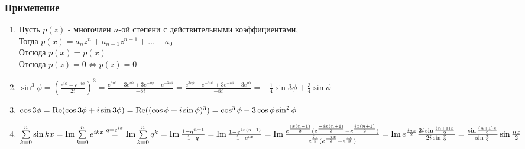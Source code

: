 \documentclass[12pt]{article}
\begin{document}
\subsubsection{Применение}
\begin{enumerate}
    \item Пусть $p(z)$ - многочлен $n$-ой степени с действительными коэффициентами,\\
    Тогда $p(x) = a_nz^n+a_{n-1}z^{n-1} + \ldots + a_0$\\
    Отсюда $p(\overline{x}) = \overline{p(x)}$\\
    Отсюда $p(z) = 0 \Leftrightarrow p(\overline{z}) = 0$
    \item $\sin^3 \phi = \left(\frac{e^{i\phi}-e^{-i\phi}}{2i}\right)^3 = \frac{e^{3i\phi}-3e^{i\phi}+3e^{-i\phi}-e^{-3i\phi}}{-8i} = \frac{e^{3i\phi}-e^{-3i\phi}+3e^{-i\phi}-3e^{i\phi}}{-8i} = -\frac14 \sin 3\phi + \frac34 \sin \phi$
    \item $\cos 3\phi = \operatorname{Re}(\cos 3\phi + i\sin 3\phi) = \operatorname{Re}((\cos \phi + i\sin\phi)^3) =\cos^3 \phi - 3\cos\phi\sin^2\phi$
    \item $\sum\limits_{k=0}^n \sin kx = \operatorname{Im} \sum\limits_{k=0}^n e^{ikx} \overset{q=e^{ix}}= \operatorname{Im} \sum\limits_{k=0}^n q^k = \operatorname{Im} \frac{1-q^{n+1}}{1-q} = \operatorname{Im} \frac{1-e^{ix(n+1)}}{1-e^{ix}} = \operatorname{Im} \frac{e^\frac{ix(n+1)}{2}(e^\frac{-ix(n+1)}{2}-e^\frac{ix(n+1)}{2})}{e^\frac{ix}{2}(e^\frac{-ix}{2}-e^\frac{ix}{2})} = \operatorname{Im} e^{\frac{inx}{2}}\frac{2i\sin\frac{(n+1)x}{2}}{2i\sin \frac x2} = \frac{\sin \frac{(n+1)x}{2}}{\sin \frac x2}\sin \frac{nx}{2}$
\end{enumerate}
\end{document}
